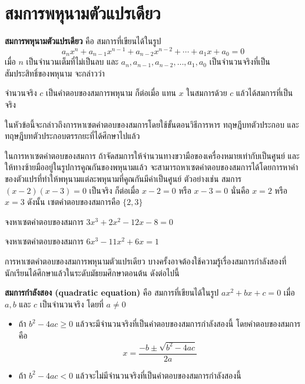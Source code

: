\newpage

\section{สมการพหุนามตัวแปรเดียว}

\textbf{สมการพหุนามตัวแปรเดียว} คือ สมการที่เขียนได้ในรูป
\begin{equation*}
	a_{n} x^{n} + a_{n-1} x^{n-1} + a_{n-2} x^{n-2} + \cdots + a_{1} x + a_{0} = 0
\end{equation*}
เมื่อ $n$ เป็นจำนวนเต็มที่ไม่เป็นลบ และ $a_{n}, a_{n-1}, a_{n-2}, \ldots, a_{1}, a_{0}$ เป็นจำนวนจริงที่เป็นสัมประสิทธิ์ของพหุนาม จะกล่าวว่า 
\begin{center}
	จำนวนจริง $c$ เป็นคำตอบของสมการพหุนาม ก็ต่อเมื่อ แทน $x$ ในสมการด้วย $c$ แล้วได้สมการที่เป็นจริง
\end{center}
 ในหัวข้อนี้จะกล่าวถึงการหาเซตคำตอบของสมการโดยใช้ขั้นตอนวิธีการหาร ทฤษฎีบทตัวประกอบ และทฤษฎีบทตัวประกอบตรรกยะที่ได้ศึกษาไปแล้ว

\begin{conceptbox}
	ในการหาเซตคำตอบของสมการ ถ้าจัดสมการให้จำนวนทางขวามือของเครื่องหมายเท่ากับเป็นศูนย์ และให้ทางซ้ายมืออยู่ในรูปการคูณกันของพหุนามแล้ว จะสามารถหาเซตคำตอบของสมการได้โดยการหาค่าของตัวแปรที่ทำให้พหุนามแต่ละพหุนามที่คูณกันมีค่าเป็นศูนย์ ตัวอย่างเช่น สมการ $(x-2)(x-3) = 0$ เป็นจริง ก็ต่อเมื่อ $x-2 = 0$ หรือ $x-3 = 0$ นั่นคือ $x = 2$ หรือ $x = 3$ ดังนั้น เซตคำตอบของสมการคือ $\{2, 3\}$
\end{conceptbox}

\vspace{1em}

\begin{examplebox}
	จงหาเซตคำตอบของสมการ $3x^3 + 2x^2 - 12x - 8 = 0$
\end{examplebox}
\solution
\newpage

\begin{examplebox}
	จงหาเซตคำตอบของสมการ $6x^3 - 11x^2 + 6x = 1$
\end{examplebox}
\solution
\newpage

การหาเซตคำตอบของสมการพหุนามตัวแปรเดียว บางครั้งอาจต้องใช้ความรู้เรื่องสมการกำลังสองที่นักเรียนได้ศึกษาแล้วในระดับมัธยมศึกษาตอนต้น ดังต่อไปนี้

\vspace{1em}

\begin{remarkbox}
	\textbf{สมการกำลังสอง (quadratic equation)} คือ สมการที่เขียนได้ในรูป $ax^2 + bx + c = 0$ เมื่อ $a, b$ และ $c$ เป็นจำนวนจริง โดยที่ $a \neq 0$
\begin{itemize}
	\item 	ถ้า $b^2 - 4ac \geq 0$ แล้วจะมีจำนวนจริงที่เป็นคำตอบของสมการกำลังสองนี้ โดยคำตอบของสมการคือ 
	\begin{equation*}
		x = \frac{-b \pm \sqrt{b^2 - 4ac}}{2a}
	\end{equation*}
\item 	ถ้า $b^2 - 4ac < 0$ แล้วจะไม่มีจำนวนจริงที่เป็นคำตอบของสมการกำลังสองนี้
\end{itemize}
\end{remarkbox}

